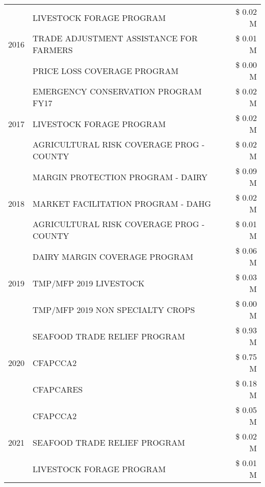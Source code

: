 \begin{tabular}{llr}
\cline{1-3}
\multirow[t]{3}{*}{2016} & LIVESTOCK FORAGE PROGRAM & \$ 0.02 M \\
 & TRADE ADJUSTMENT ASSISTANCE FOR FARMERS & \$ 0.01 M \\
 & PRICE LOSS COVERAGE PROGRAM & \$ 0.00 M \\
\cline{1-3}
\multirow[t]{3}{*}{2017} & EMERGENCY CONSERVATION PROGRAM FY17 & \$ 0.02 M \\
 & LIVESTOCK FORAGE PROGRAM & \$ 0.02 M \\
 & AGRICULTURAL RISK COVERAGE PROG - COUNTY & \$ 0.02 M \\
\cline{1-3}
\multirow[t]{3}{*}{2018} & MARGIN PROTECTION PROGRAM - DAIRY & \$ 0.09 M \\
 & MARKET FACILITATION PROGRAM - DAHG & \$ 0.02 M \\
 & AGRICULTURAL RISK COVERAGE PROG - COUNTY & \$ 0.01 M \\
\cline{1-3}
\multirow[t]{3}{*}{2019} & DAIRY MARGIN COVERAGE PROGRAM & \$ 0.06 M \\
 & TMP/MFP 2019 LIVESTOCK & \$ 0.03 M \\
 & TMP/MFP 2019 NON SPECIALTY CROPS & \$ 0.00 M \\
\cline{1-3}
\multirow[t]{3}{*}{2020} & SEAFOOD TRADE RELIEF PROGRAM & \$ 0.93 M \\
 & CFAPCCA2 & \$ 0.75 M \\
 & CFAPCARES & \$ 0.18 M \\
\cline{1-3}
\multirow[t]{3}{*}{2021} & CFAPCCA2 & \$ 0.05 M \\
 & SEAFOOD TRADE RELIEF PROGRAM & \$ 0.02 M \\
 & LIVESTOCK FORAGE PROGRAM & \$ 0.01 M \\
\cline{1-3}
\bottomrule
\end{tabular}
